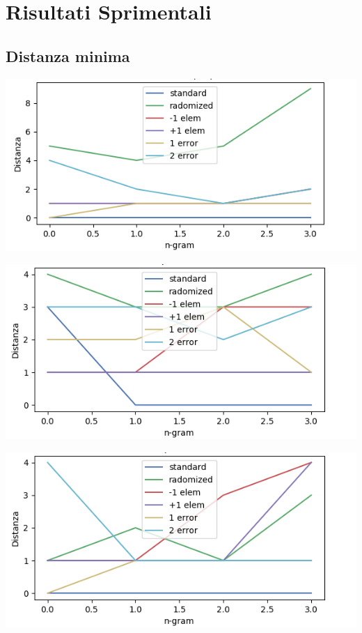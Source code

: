\documentclass{article}
\begin{document}
\newpage
\section{Risultati Sprimentali}

\subsection{Distanza minima}

\begin{center}
\begin{minipage}{0.8\linewidth}


    \includegraphics[width=\linewidth]{img/dist_9K.png}
\end{minipage}%
\hfill
\begin{minipage}{0.8\linewidth}
    \includegraphics[width=\linewidth]{img/dist_60K.png}
\end{minipage}%
\hfill
\begin{minipage}{0.8\linewidth}
    \includegraphics[width=\linewidth]{img/dist_280K.png}
\end{minipage}%
\end{center}
\end{document}
